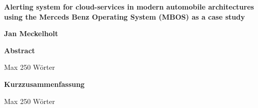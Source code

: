 \thispagestyle{plain}
\begin{center}
    \Large
    \textbf{Alerting system for cloud-services in modern automobile architectures using the Merceds Benz Operating System (MBOS) as a case study}
    
    \vspace{0.4cm}
    \large
    
    \vspace{0.4cm}
    \textbf{Jan Meckelholt}
    
    \vspace{0.9cm}
    \textbf{Abstract}

Max 250 Wörter

 \vspace{3cm}
    \textbf{Kurzzusammenfassung}

Max 250 Wörter

\end{center}